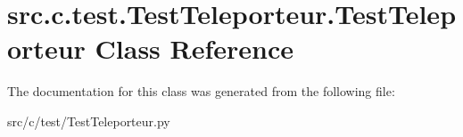 \hypertarget{classsrc_1_1c_1_1test_1_1_test_teleporteur_1_1_test_teleporteur}{}\section{src.\+c.\+test.\+Test\+Teleporteur.\+Test\+Teleporteur Class Reference}
\label{classsrc_1_1c_1_1test_1_1_test_teleporteur_1_1_test_teleporteur}


The documentation for this class was generated from the following file\+:\begin{DoxyCompactItemize}
\item 
src/c/test/Test\+Teleporteur.\+py\end{DoxyCompactItemize}
